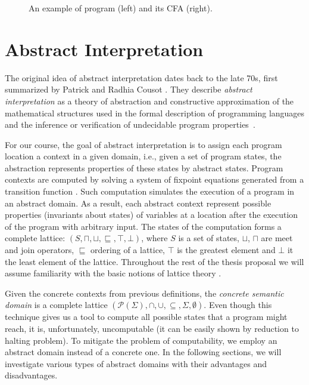 \begin{figure}
\begin{minipage}[t]{0.48\textwidth}
\begin{tikzpicture}[node distance=1.1em]
\end{tikzpicture}
\end{minipage}

\caption{An example of \llvm program (left) and its CFA (right).}
\label{fig:cfa}
\end{figure}

\section{Abstract Interpretation}
\label{sec:abstraction}

The original idea of abstract interpretation dates back to the late 70s, first
summarized by Patrick and Radhia Cousot \cite{Cousot1977}.
They describe \emph{abstract interpretation} as a theory of abstraction and
constructive approximation of the mathematical structures used in the formal
description of programming languages and the inference or verification of
undecidable program properties~\cite{Cousot2012}.

For our course, the goal of abstract interpretation is to assign each program
location a context in a given domain, i.e., given a set of program states, the
abstraction represents properties of these states by abstract states. Program
contexts are computed by solving a system of fixpoint equations generated from
a transition function \cite{Cousot1977}. Such computation simulates the
execution of a program in an abstract domain. As a result, each abstract context represent possible properties (invariants about states) of variables at a location after the execution of the program
with arbitrary input. The states of the computation forms
a complete lattice: $(S, \sqcap, \sqcup, \sqsubseteq, \top, \bot)$, where $S$
is a set of states, $\sqcup$, $\sqcap$ are meet and join operators,
$\sqsubseteq$ ordering of a lattice, $\top$ is the greatest element and $\bot$
it the least element of the lattice. Throughout the rest of the thesis proposal
we will assume familiarity with the basic notions of lattice theory
\cite{Birkhoff1940}.

Given the concrete contexts from previous definitions, the \emph{concrete
semantic domain} is a complete lattice $(\mathcal{P}(\Sigma), \cap, \cup,
\subseteq, \Sigma, \emptyset)$. Even though this technique gives us a tool to
compute all possible states that a program might reach, it is, unfortunately,
uncomputable (it can be easily shown by reduction to halting problem). To
mitigate the problem of computability, we employ an abstract domain instead of
a concrete one. In the following sections, we will investigate various types of
abstract domains with their advantages and disadvantages.

